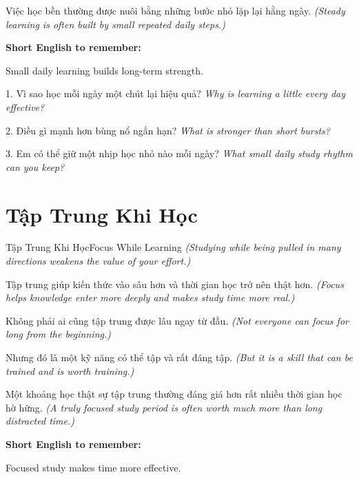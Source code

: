 \begin{baihoc}
Việc học bền thường được nuôi bằng những bước nhỏ lặp lại hằng ngày.
\textit{(Steady learning is often built by small repeated daily steps.)}
\end{baihoc}

\begin{ghinhoanh}
\textbf{Short English to remember:}

Small daily learning builds long-term strength.

\end{ghinhoanh}

\begin{tuhocnhanh}
1. Vì sao học mỗi ngày một chút lại hiệu quả? \textit{Why is learning a little every day effective?}

2. Điều gì mạnh hơn bùng nổ ngắn hạn? \textit{What is stronger than short bursts?}

3. Em có thể giữ một nhịp học nhỏ nào mỗi ngày? \textit{What small daily study rhythm can you keep?}
\end{tuhocnhanh}
\ngancach

\section{Tập Trung Khi Học}
\begin{truyen}{Tập Trung Khi Học}{Focus While Learning}
\textit{(Studying while being pulled in many directions weakens the value of your effort.)}

Tập trung giúp kiến thức vào sâu hơn và thời gian học trở nên thật hơn.
\textit{(Focus helps knowledge enter more deeply and makes study time more real.)}

Không phải ai cũng tập trung được lâu ngay từ đầu.
\textit{(Not everyone can focus for long from the beginning.)}

Nhưng đó là một kỹ năng có thể tập và rất đáng tập.
\textit{(But it is a skill that can be trained and is worth training.)}
\end{truyen}

\begin{baihoc}
Một khoảng học thật sự tập trung thường đáng giá hơn rất nhiều thời gian học hờ hững.
\textit{(A truly focused study period is often worth much more than long distracted time.)}
\end{baihoc}

\begin{ghinhoanh}
\textbf{Short English to remember:}

Focused study makes time more effective.

\end{ghinhoanh}

